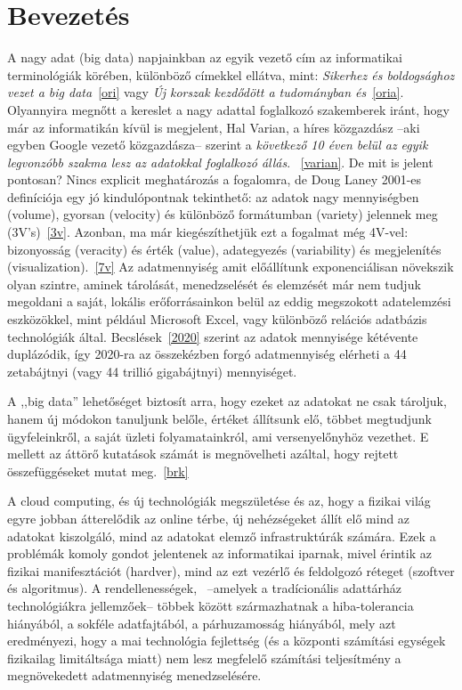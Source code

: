 \documentclass[a4paper,12pt]{article}
\author{Belényesi Roland}
\begin{document}
\section{Bevezetés}
A nagy adat (big data) napjainkban az egyik vezető cím az informatikai terminológiák körében, különböző címekkel ellátva, mint: 
\textsl{Sikerhez és boldogsághoz vezet a big data}~\ref{ori} vagy 
\textsl{Új korszak kezdődött a tudományban és}~\ref{oria}. Olyannyira megnőtt a kereslet a nagy adattal foglalkozó szakemberek iránt, hogy már az informatikán kívül is megjelent, Hal Varian, a híres közgazdász --aki egyben Google vezető közgazdásza-- szerint a \textsl{következő 10 éven belül az egyik legvonzóbb szakma lesz az adatokkal foglalkozó állás}. ~\ref{varian}. De mit is jelent pontosan? Nincs explicit meghatározás a fogalomra, de Doug Laney 2001-es definíciója egy jó kindulópontnak tekinthető: az adatok nagy mennyiségben (volume), gyorsan (velocity) és különböző formátumban (variety) jelennek meg (3V's)~\ref{3v}. Azonban, ma már kiegészíthetjük ezt a fogalmat még 4V-vel: bizonyosság (veracity) és érték (value), adategyezés (variability) és megjelenítés (visualization).~\ref{7v} Az adatmennyiség amit előállítunk exponenciálisan növekszik olyan szintre, aminek tárolását, menedzselését és elemzését már nem tudjuk megoldani a saját, lokális erőforrásainkon belül az eddig megszokott adatelemzési eszközökkel, mint például Microsoft Excel, vagy különböző relációs adatbázis technológiák által.
Becslések~\ref{2020} szerint az adatok mennyisége kétévente duplázódik, így 2020-ra az összekézben forgó adatmennyiség elérheti a 44 zetabájtnyi (vagy 44 trillió gigabájtnyi) mennyiséget.
\linebreak

A ,,big data'' lehetőséget biztosít arra, hogy ezeket az adatokat ne csak tároljuk, hanem új módokon tanuljunk belőle, értéket állítsunk elő, többet megtudjunk ügyfeleinkről, a saját üzleti folyamatainkról, ami versenyelőnyhöz vezethet. E mellett az áttörő kutatások számát is megnövelheti azáltal, hogy rejtett összefüggéseket mutat meg.~\ref{brk} 

A cloud computing, és új technológiák megszületése és az, hogy a fizikai világ egyre jobban átterelődik az online térbe, új nehézségeket állít elő mind az adatokat kiszolgáló, mind az adatokat elemző infrastruktúrák számára. Ezek a problémák komoly gondot jelentenek az informatikai iparnak, mivel érintik az fizikai manifesztációt (hardver), mind az ezt vezérlő és feldolgozó réteget (szoftver és algoritmus). A rendellenességek,~\cite{dst} --amelyek a tradícionális adattárház technológiákra jellemzőek-- többek között származhatnak a hiba-tolerancia hiányából, a sokféle adatfajtából, a párhuzamosság hiányából, mely azt eredményezi, hogy a mai technológia fejlettség (és a központi számítási egységek fizikailag limitáltsága miatt) nem lesz megfelelő számítási teljesítmény a megnövekedett adatmennyiség menedzselésére.
\end{document}
